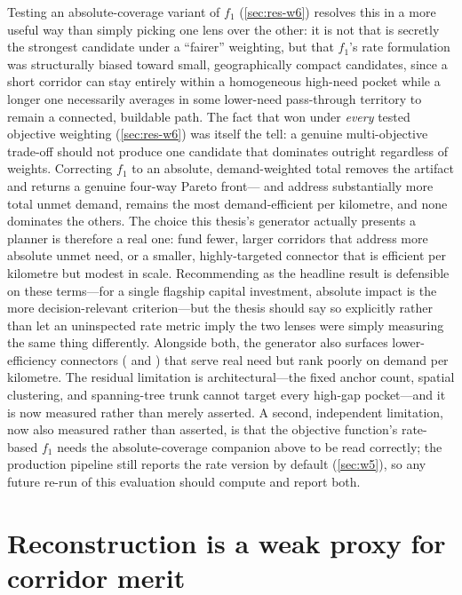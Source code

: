 Testing an absolute-coverage variant of $f_1$ (\cref{sec:res-w6}) resolves this in a more
useful way than simply picking one lens over the other: it is not that  is
secretly the strongest candidate under a ``fairer'' weighting, but that $f_1$'s rate
formulation was structurally biased toward small, geographically compact candidates,
since a short corridor can stay entirely within a homogeneous high-need pocket while a
longer one necessarily averages in some lower-need pass-through territory to remain a
connected, buildable path. The fact that  won under \emph{every} tested
objective weighting (\cref{sec:res-w6}) was itself the tell: a genuine multi-objective
trade-off should not produce one candidate that dominates outright regardless of
weights. Correcting $f_1$ to an absolute, demand-weighted total removes the artifact and
returns a genuine four-way Pareto front--- and  address
substantially more total unmet demand,  remains the most demand-efficient
per kilometre, and none dominates the others. The choice this thesis's generator
actually presents a planner is therefore a real one: fund fewer, larger corridors that
address more absolute unmet need, or a smaller, highly-targeted connector that is
efficient per kilometre but modest in scale. Recommending  as the
headline result is defensible on these terms---for a single flagship capital
investment, absolute impact is the more decision-relevant criterion---but the thesis
should say so explicitly rather than let an uninspected rate metric imply the two
lenses were simply measuring the same thing differently. Alongside both,
the generator also surfaces lower-efficiency connectors ( and
) that serve real need but rank poorly on demand per kilometre. The residual
limitation is architectural---the fixed anchor count, spatial clustering, and
spanning-tree trunk cannot target every high-gap pocket---and it is now measured rather
than merely asserted. A second, independent limitation, now also measured rather than
asserted, is that the objective function's rate-based $f_1$ needs the absolute-coverage
companion above to be read correctly; the production pipeline still reports the rate
version by default (\cref{sec:w5}), so any future re-run of this evaluation should
compute and report both.

\section{Reconstruction is a weak proxy for corridor merit}
\label{sec:disc-reconstruction}

